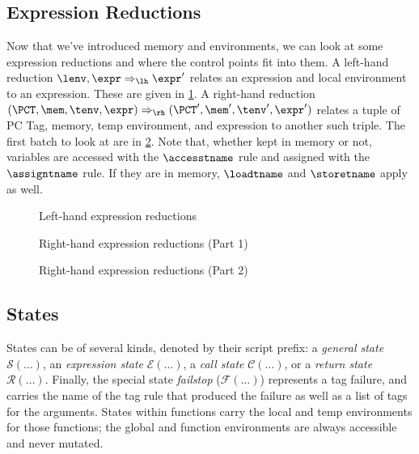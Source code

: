 \documentclass{article}
\begin{document}
\subsection{Expression Reductions}

Now that we've introduced memory and environments, we can look at some
expression reductions and where the control points fit into them.
A left-hand reduction \(\lenv,\expr \Rightarrow_\lh \expr'\)
relates an expression and local environment to an expression.
These are given in \cref{fig:lexprsteps}.
A right-hand reduction
\((\PCT,\mem,\tenv,\expr) \Rightarrow_\rh (\PCT',\mem',\tenv',\expr')\)
relates a tuple of PC Tag, memory, temp environment, and expression to another such triple.
The first batch to look at are in \cref{fig:rexprsteps1}. Note that,
whether kept in memory or not, variables are accessed with the \(\accesstname\)
rule and assigned with the \(\assigntname\) rule. If they are in memory,
\(\loadtname\) and \(\storetname\) apply as well.

\begin{figure}
  \varlocalstep
  \varglobalstep
  \funglobalstep
  \fieldstructstep

  \caption{Left-hand expression reductions}
  \label{fig:lexprsteps}
\end{figure}

\begin{figure}
  \derefstep
  \valofstep
  \valoftmpstep
  \addrofstep
  \addroffunstep
  \assignstep
  \assigntmpstep
  
  \caption{Right-hand expression reductions (Part 1)}
  \label{fig:rexprsteps1}
\end{figure}

\begin{figure}
  \unopstep
  \binopstep
  \seqandtruestep
  \seqandfalsestep
  \seqortruestep
  \seqorfalsestep
  \conditionstep
  \commastep
  \parenstep
  \iicaststep
  \picaststep
  \ipcaststep
  \ppcaststep

  \caption{Right-hand expression reductions (Part 2)}
  \label{fig:rexprsteps2}
\end{figure}

\subsection{States}

States can be of several kinds, denoted by their script prefix: a {\em general state} \(\mathcal{S}(\dots)\),
an {\em expression state} \(\mathcal{E}(\dots)\), a {\em call state} \(\mathcal{C}(\dots)\), or a
{\em return state} \(\mathcal{R}(\dots)\). Finally, the special state {\em failstop} (\(\mathcal{F}(\dots)\))
represents a tag failure, and carries the name of the tag rule that produced the failure as well
as a list of tags for the arguments. States within functions carry the local and temp environments
for those functions; the global and function environments are always accessible and never
mutated.
\end{document}

